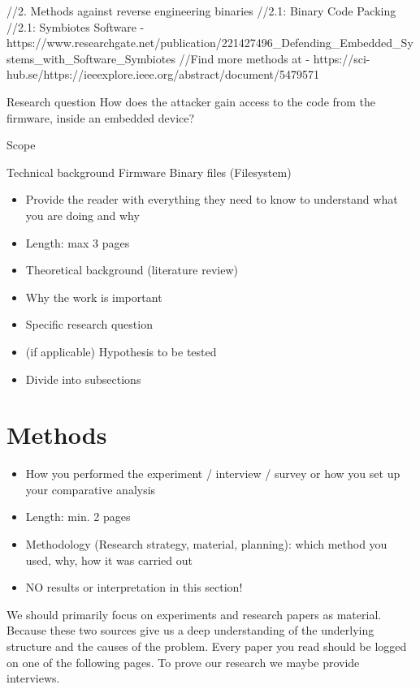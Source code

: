 \documentclass[]{report}
\begin{document}
//2. Methods against reverse engineering binaries
//2.1: Binary Code Packing
//2.1: Symbiotes Software - https://www.researchgate.net/publication/221427496_Defending_Embedded_Systems_with_Software_Symbiotes
//Find more methods at - https://sci-hub.se/https://ieeexplore.ieee.org/abstract/document/5479571

Research question
How does the attacker gain access to the code from the firmware, inside an embedded device?

Scope

Technical background
Firmware
Binary files (Filesystem)

\begin{itemize}
	\item Provide the reader with everything they need to know to understand what you are doing and why

	\item Length: max 3 pages
	\item Theoretical background (literature review)
	\item Why the work is important
	\item Specific research question
	\item (if applicable) Hypothesis to be tested
	\item Divide into subsections
\end{itemize}



\section{Methods}
\begin{itemize}
	\item How you performed the experiment / interview / survey or how you set up your comparative analysis
	\item Length: min. 2 pages
	\item Methodology (Research strategy, material, planning): which method you used, why, how it was carried out
	\item NO results or interpretation in this section!
\end{itemize}

We should primarily focus on experiments and research papers as material. Because these two sources give us a deep understanding of the underlying structure and the causes of the problem. Every paper you read should be logged on one of the following pages. To prove our research we maybe provide interviews.
\end{document}

